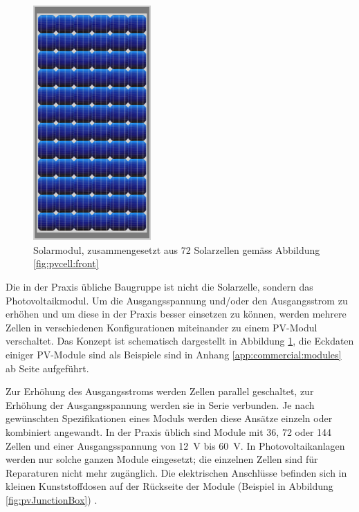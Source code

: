 \clearpage
\begin{figure}
    \centering
    \includegraphics[width=0.4\textwidth]{images/solar-facility/pvmodule.jpeg}
    \caption{
        Solarmodul,  zusammengesetzt  aus  72 Solarzellen  gem\"ass  Abbildung
        \ref{fig:pvcell:front}%
    }
    \label{fig:pvmodule}
\end{figure}


Die  in der  Praxis  \"ubliche  Baugruppe ist  nicht  die Solarzelle,  sondern
das  Photovoltaikmodul.  Um  die Ausgangsspannung  und/oder den  Ausgangsstrom
zu  erh\"ohen  und um  diese  in  der  Praxis  besser einsetzen  zu  k\"onnen,
werden mehrere  Zellen in  verschiedenen Konfigurationen miteinander  zu einem
PV-Modul  verschaltet. Das Konzept  ist schematisch  dargestellt in  Abbildung
\ref{fig:pvmodule}, die Eckdaten einiger PV-Module  sind als Beispiele sind in
Anhang \ref{app:commercial:modules}  ab Seite \pageref{app:commercial:modules}
aufgef\"uhrt.

Zur  Erh\"ohung  des Ausgangsstroms  werden  Zellen  parallel geschaltet,  zur
Erh\"ohung  der  Ausgangsspannung werden  sie  in  Serie verbunden.   Je  nach
gew\"unschten Spezifikationen eines Moduls werden diese Ans\"atze einzeln oder
kombiniert angewandt.  In der Praxis \"ublich  sind Module mit 36, 72 oder 144
Zellen und  einer Ausgangsspannung  von \SI{12}{\volt}  bis \SI{60}{\volt}. In
Photovoltaikanlagen werden nur solche  ganzen Module eingesetzt; die einzelnen
Zellen  sind  f\"ur  Reparaturen  nicht  mehr  zug\"anglich. Die  elektrischen
Anschl\"usse befinden sich in kleinen  Kunststoffdosen auf der R\"uckseite der
Module (Beispiel in Abbildung \ref{fig:pvJunctionBox}) \cite{ref:pv:baunetz}.


